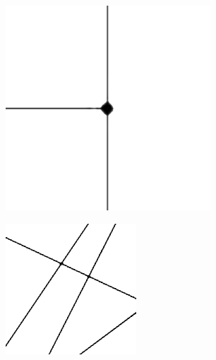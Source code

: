 \begin{figure}[htb]
\begin{minipage}{0.15\textwidth}
        \label{fig:intersection1}
    \end{minipage}
    \hfill
    \begin{minipage}{0.15\textwidth}
        \centering
        \includegraphics[width=\textwidth]{pictures/intersection2.png}
        \label{fig:intersection2}
    \end{minipage}
    \hfill
    \begin{minipage}{0.15\textwidth}
        \centering
        \includegraphics[width=\textwidth]{pictures/intersection3.png}

\end{minipage}
\end{figure}
